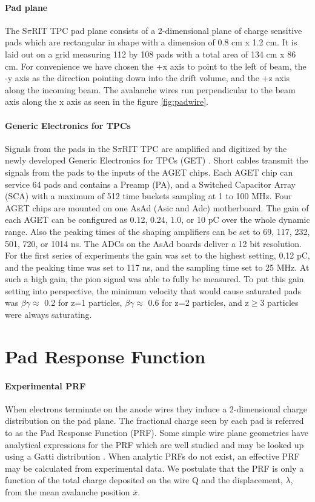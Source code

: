 \documentclass[review]{elsarticle}
\begin{document}
\paragraph{Pad plane} 
The S$\pi$RIT TPC pad plane consists of a 2-dimensional plane of charge sensitive pads which are rectangular in shape with a dimension of 0.8 cm x 1.2 cm. It is laid out on a grid measuring 112 by 108 pads with a total area of 134 cm x 86 cm. For convenience we have chosen the +x axis to point to the left of beam, the -y axis as the direction pointing down into the drift volume, and the +z axis along the incoming beam. The avalanche wires run perpendicular to the beam axis along the x axis as seen in the figure \ref{fig:padwire}. 
\paragraph{Generic Electronics for TPCs}
Signals from the pads in the S$\pi$RIT TPC are amplified and digitized by the newly developed Generic Electronics for TPCs (GET) \cite{get}.  Short cables transmit the signals from the pads to the inputs of the AGET chips. Each AGET chip can service 64 pads and contains a Preamp (PA), and a Switched Capacitor Array (SCA) with a maximum of 512 time buckets sampling at 1 to 100 MHz. Four AGET chips are mounted on one AsAd (Asic and Adc) motherboard. The gain of each AGET can be configured as 0.12, 0.24, 1.0, or 10 pC over the whole dynamic range. Also the peaking times of the shaping amplifiers can be set to 69, 117, 232, 501, 720, or 1014 ns. The ADCs on the AsAd boards deliver a 12 bit resolution. For the first series of experiments the gain was set to the highest setting, 0.12 pC, and the peaking time was set to 117 ns, and the sampling time set to 25 MHz. At such a high gain, the pion signal was able to fully be measured. To put this gain setting into perspective, the minimum velocity that would cause saturated pads was $\beta\gamma\approx$ 0.2 for z=1 particles, $\beta\gamma\approx$ 0.6 for z=2 particles, and z$\geq$3 particles were always saturating. 

\section{Pad Response Function}
\paragraph{Experimental PRF}
When electrons terminate on the anode wires they induce a 2-dimensional charge distribution on the pad plane. The fractional charge seen by each pad is referred to as the Pad Response Function (PRF). Some simple wire plane geometries have analytical expressions for the PRF which are well studied and may be looked up using a Gatti distribution \cite{blumrol}. When analytic PRFs do not exist, an effective PRF may be calculated from experimental data. We postulate that the PRF is only a function of the total charge deposited on the wire Q and the displacement, $\lambda$, from the mean avalanche position $\bar{x}$.
\end{document}
